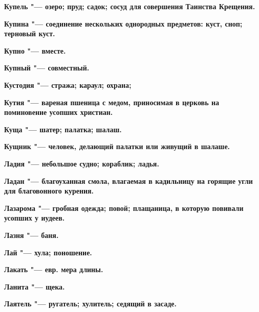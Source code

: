 \bfseries Купель \normalfont{} "--- озеро; пруд; садок; сосуд для совершения Таинства Крещения. 




\bfseries Купина \normalfont{} "--- соединение нескольких однородных предметов: куст, сноп; терновый куст. 




\bfseries Купно \normalfont{} "--- вместе. 




\bfseries Купный \normalfont{} "--- совместный. 




\bfseries Кустодия \normalfont{} "--- стража; караул; охрана; 




\bfseries Кутия \normalfont{} "--- вареная пшеница с медом, приносимая в церковь на поминовение усопших христиан. 




\bfseries Куща \normalfont{} "--- шатер; палатка; шалаш. 




\bfseries Кущник \normalfont{} "--- человек, делающий палатки или живущий в шалаше. 




 





\bfseries Ладия \normalfont{} "--- небольшое судно; кораблик; ладья. 




\bfseries Ладан \normalfont{} "--- благоуханная смола, влагаемая в кадильницу на горящие угли для благовонного курения. 




\bfseries Лазарома \normalfont{} "--- гробная одежда; повой; плащаница, в которую повивали усопших у иудеев. 




\bfseries Лазня \normalfont{} "--- баня. 




\bfseries Лай \normalfont{} "--- хула; поношение. 




\bfseries Лакать \normalfont{} "--- евр. мера длины. 




\bfseries Ланита \normalfont{} "--- щека. 




\bfseries Лаятель \normalfont{} "--- ругатель; хулитель; седящий в засаде. 




